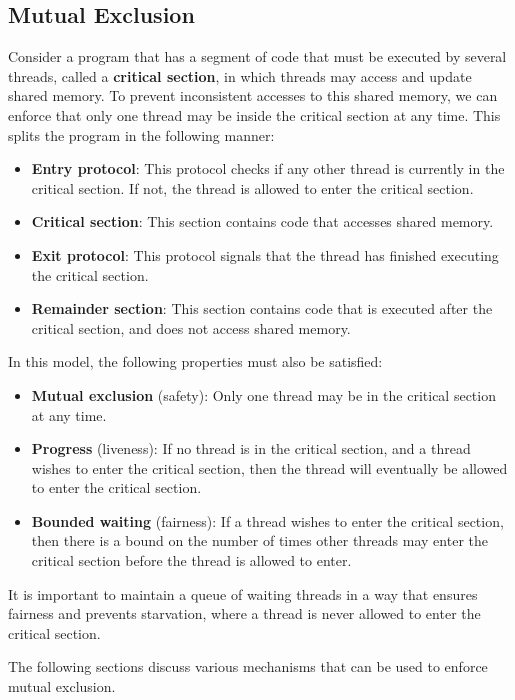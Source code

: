 \documentclass{article}
\begin{document}
\subsection{Mutual Exclusion}
Consider a program that has a segment of code that must be executed by
several threads, called a \textbf{critical section}, in which threads
may access and update shared memory. To prevent inconsistent accesses
to this shared memory, we can enforce that only one thread may be
inside the critical section at any time. This splits the program in the
following manner:
\begin{itemize}
    \item \textbf{Entry protocol}: This protocol checks if any other
          thread is currently in the critical section. If not, the
          thread is allowed to enter the critical section.
    \item \textbf{Critical section}: This section contains code that
          accesses shared memory.
    \item \textbf{Exit protocol}: This protocol signals that the thread
          has finished executing the critical section.
    \item \textbf{Remainder section}: This section contains code that
          is executed after the critical section, and does not access shared
          memory.
\end{itemize}
In this model, the following properties must also be satisfied:
\begin{itemize}
    \item \textbf{Mutual exclusion} (safety): Only one thread may be in
          the critical section at any time.
    \item \textbf{Progress} (liveness): If no thread is in the critical
          section, and a thread wishes to enter the critical section,
          then the thread will eventually be allowed to enter the
          critical section.
    \item \textbf{Bounded waiting} (fairness): If a thread wishes to
          enter the critical section, then there is a bound on the
          number of times other threads may enter the critical section
          before the thread is allowed to enter.
\end{itemize}
It is important to maintain a queue of waiting threads in a way that
ensures fairness and prevents starvation, where a thread is never
allowed to enter the critical section.

The following sections discuss various mechanisms that can be used to
enforce mutual exclusion.
\end{document}
